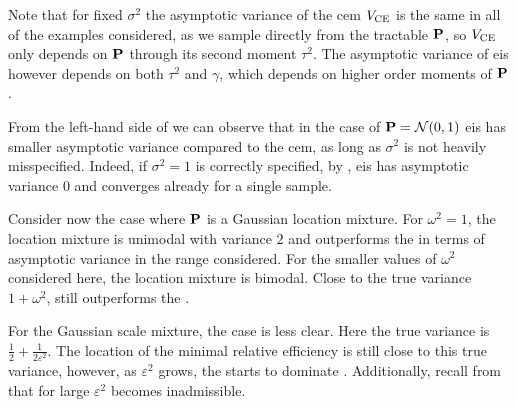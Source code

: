 \vspace{16pt}
Note that for fixed $\sigma^{2}$ the asymptotic variance of the \acrshort{cem} $V_{\ce}$ is the same in all of the examples considered, as we sample directly from the tractable $\P$, so $V_{\ce}$ only depends on $\P$ through its second moment $\tau^{2}$. 
The asymptotic variance of \acrshort{eis} however depends on both $\tau^{2}$ and $\gamma$, which depends on higher order moments of $\P$.

From the left-hand side of  we can observe that in the case of $\P = \mathcal N(0,1)$ \acrshort{eis} has smaller asymptotic variance compared to the \acrshort{cem}, as long as $\sigma^{2}$ is not heavily misspecified. Indeed, if $\sigma^{2} = 1$ is correctly specified, by , \acrshort{eis} has asymptotic variance $0$ and converges already for a single sample. 

Consider now the case where $\P$ is a Gaussian location mixture. For $\omega^{2} = 1$, the location mixture is unimodal with variance $2$ and \aeis outperforms the \acem in terms of asymptotic variance in the range considered. For the smaller values of $\omega^{2}$ considered here, the location mixture is bimodal. Close to the true variance $1 + \omega^{2}$, \aeis still outperforms the \acem. 

For the Gaussian scale mixture, the case is less clear. Here the true variance is $\frac{1}{2} + \frac{1}{2 \varepsilon^{2}}$. The location of the minimal relative efficiency is still close to this true variance, however, as $\varepsilon^{2}$ grows, the \acem starts to dominate \aeis. Additionally, recall from  that for large $\varepsilon^{2}$ \aeis becomes inadmissible. 

